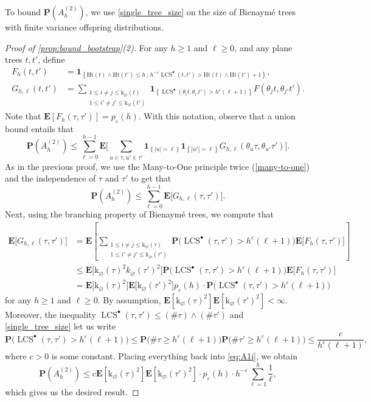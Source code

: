 \documentclass[11pt,reqno]{amsart}
\newcommand{\1}{\mathbf{1}}
\newcommand{\0}{\mathbf{0}}
\newcommand{\E}{{\mathbf E}}
\newcommand{\I}[1]{{\mathbf 1}_{\left\{#1\right\}}}
\newcommand{\prob}{\mathbf{P}}
\newcommand{\ex}{\mathbf{E}}
\newcommand{\Ht}{\mathrm{Ht}}
\newcommand{\rk}{\mathrm{k}}
\newcommand{\LCS}{\operatorname{LCS}}
\renewcommand{\emptyset}{\varnothing}
\begin{document}
To bound $\prob(A_h^{(2)})$, we use \cref{single_tree_size} on the size of Bienaymé trees with finite variance offspring distributions.

\begin{proof}[Proof of \cref{prop:bound_bootstrap}(2)]
    For any $h\geq 1$ and $\ell\geq 0$, and any plane trees $t,t'$, define
    \begin{align*}
        F_{h}(t,t')&=\I{\Ht(t)\wedge \Ht(t')\leq h\, ;\, h^{-\varepsilon}\LCS^\bullet(t,t')> \Ht(t)\wedge\Ht(t')+1},\\
        G_{h,\ell}(t,t')&=\sum_{\substack{1 \leq i \ne j \leq \rk_\emptyset(t) \\ 1 \leq i' \ne j' \leq \rk_{\emptyset}(t')}}\!\! \I{\LCS^\bullet(\theta_{i} t,\theta_{i'}t')>h^\varepsilon(\ell+1)} F(\theta_j t,\theta_{j'}t').
    \end{align*}
    Note that $\E[F_h(\tau,\tau')]=p_\varepsilon(h)$. With this notation, observe that a union bound entails that
    \[\prob(A_h^{(2)})\leq \sum_{\ell=0}^{h-1}\E\bigg[\sum_{u\in\tau,u'\in\tau'}\I{|u|=\ell}\I{|u'|=\ell}G_{h,\ell}(\theta_u\tau,\theta_{u'}\tau')\bigg].\]
    As in the previous proof, we use the Many-to-One principle twice (\cref{many-to-one}) and the independence of $\tau$ and $\tau'$ to get that
    \begin{equation}\label{eq:A1i}
    \prob(A_h^{(2)}) \leq \sum_{\ell=0}^{h-1} \E\big[G_{h,\ell}(\tau,\tau')\big].
    \end{equation}
    Next, using the branching property of Bienaym\'{e} trees, we compute that
    \begin{align*}
     \E\big[G_{h,\ell}(\tau,\tau')\big]&= \ex\left[ \sum_{\substack{1 \leq i \ne j \leq \rk_\emptyset(\tau) \\ 1 \leq i' \ne j' \leq \rk_{\emptyset}(\tau')}}\!\! \prob\big(\LCS^\bullet(\tau,\tau')>h^\varepsilon(\ell+1)\big)\E\big[F_h(\tau,\tau')\big]\right]\\
    &\leq \E\big[ \rk_\emptyset(\tau)^2k_\emptyset(\tau')^2\big] \prob\big(\LCS^\bullet(\tau,\tau')>h^\varepsilon(\ell+1)\big)\E\big[F_h(\tau,\tau')\big]\\
    &= \E\big[\rk_\emptyset(\tau)^2\big]\E\big[\rk_\emptyset(\tau')^2\big] p_\varepsilon(h)\cdot \prob\big(\LCS^\bullet(\tau,\tau')>h^\varepsilon(\ell+1)\big)
    \end{align*}
    for any $h\geq 1$ and $\ell\geq 0$. By assumption, $\ex[\rk_\emptyset(\tau)^2] \ex[\rk_\emptyset(\tau')^2] < \infty$. Moreover, the inequality $\LCS^\bullet(\tau,\tau') \leq (\# \tau) \wedge (\# \tau')$ and \cref{single_tree_size} let us write 
    \[\prob\big(\LCS^\bullet(\tau,\tau')>h^\varepsilon(\ell+1)\big)\leq \prob\big(\# \tau \geq h^\varepsilon (\ell+1)\big)\prob\big(\# \tau' \geq h^\varepsilon (\ell+1)\big) \leq \frac{c}{h^\varepsilon (\ell+1)},\]
    where $c>0$ is some constant. Placing everything back into \eqref{eq:A1i}, we obtain
    \[\prob(A_h^{(2)}) \leq c\ex[\rk_\emptyset(\tau)^2]\ex[\rk_\emptyset(\tau')^2]\cdot p_\varepsilon(h)\cdot h^{-\varepsilon}\sum_{\ell=1}^{h}  \frac{1}{\ell},\]
    which gives us the desired result.
\end{proof}
\end{document}
